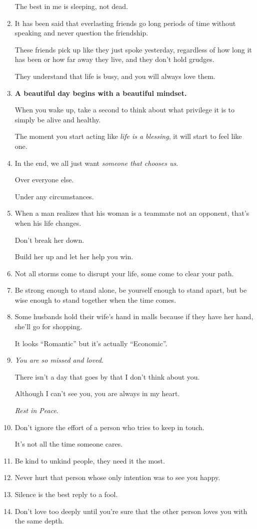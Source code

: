\documentclass{article}
\begin{document}
\begin{enumerate}
	The best in me is sleeping, not dead.
	\item It has been said that everlasting friends go long periods of time without speaking and never question the friendship.
	
	These friends pick up like they just spoke yesterday, regardless of how long it has been or how far away they live, and they don't hold grudges.
	
	They understand that life is busy, and you will always love them.
	\item \textbf{A beautiful day begins with a beautiful mindset.}
	
	When you wake up, take a second to think about what privilege it is to simply be alive and healthy.
	
	The moment you start acting like \textit{life is a blessing}, it will start to feel like one.
	\item In the end, we all just want \textit{someone that chooses us}.
	
	Over everyone else.
	
	Under any circumstances.
	\item When a man realizes that his woman is a teammate not an opponent, that's when his life changes.
	
	Don't break her down.
	
	Build her up and let her help you win.
	\item Not all storms come to disrupt your life, some come to clear your path.
	\item Be strong enough to stand alone, be yourself enough to stand apart, but be wise enough to stand together when the time comes.
	\item Some husbands hold their wife's hand in malls because if they have her hand, she'll go for shopping.
	
	It looks ``Romantic'' but it's actually ``Economic''.
	\item \textit{You are so missed and loved}.
	
	There isn't a day that goes by that I don't think about you.
	
	Although I can't see you, you are always in my heart.
	
	\textit{Rest in Peace}.
	\item Don't ignore the effort of a person who tries to keep in touch.
	
	It's not all the time someone cares.
	\item Be kind to unkind people, they need it the most.
	\item Never hurt that person whose only intention was to see you happy.
	\item Silence is the best reply to a fool.
	\item Don't love too deeply until you're sure that the other person loves you with the same depth.
	

\end{enumerate}
\end{document}
